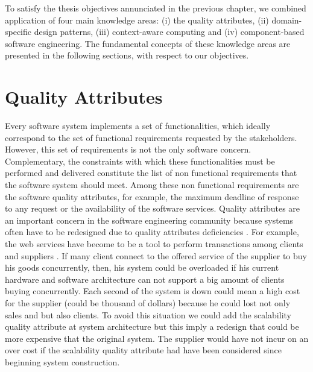 To satisfy the thesis objectives annunciated in the previous chapter, we combined application of four main knowledge areas: (i) the quality attributes, (ii) domain-specific design patterns, (iii) context-aware computing and (iv) component-based software engineering. The fundamental concepts of these knowledge areas are presented in the following sections, with respect to our objectives.


\section{Quality Attributes}
\label{subsec:qa}
Every software system implements a set of functionalities, which ideally correspond to the set of functional requirements requested by the stakeholders. However, this set of requirements is not the only software concern. Complementary, the constraints with which these functionalities must be performed and delivered constitute the list of non functional requirements that the software system should meet. Among these non functional requirements are the software quality attributes, for example, the maximum deadline of response to any request or the availability of the software services. Quality attributes are an important concern in the software engineering community because systems often have to be redesigned due to quality attributes deficiencies \cite{Bass:2003:SAP:773239}. For example, the web services have become to be a tool to perform transactions among clients and suppliers \cite{pertet2005causes}. If many client connect to the offered service of the supplier to buy his goods concurrently, then, his system could be overloaded if his current hardware and software architecture can not support a big amount of clients buying concurrently. Each second of the system is down could mean a high cost for the supplier (could be thousand of dollars) because he could lost not only sales and but also clients. To avoid this situation we could add the scalability quality attribute at system architecture but this imply a redesign that could be more expensive that the original system. The supplier would have not incur on an over cost if the scalability quality attribute had have been considered since beginning system construction.

